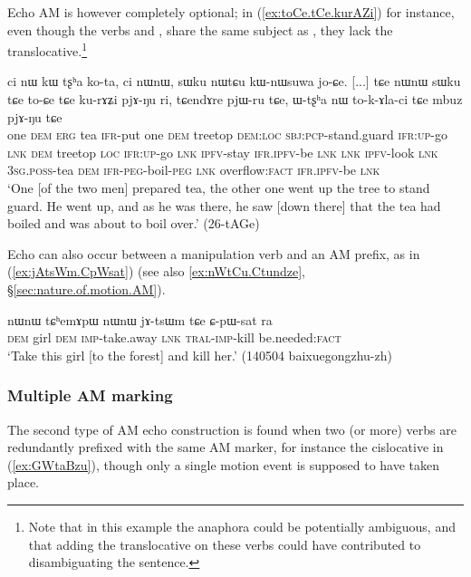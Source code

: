 Echo AM is however completely optional; in (\ref{ex:toCe.tCe.kurAZi}) for instance, even though the verbs  and , share the same subject as , they lack the translocative.\footnote{Note that in this example the anaphora could be potentially ambiguous, and that adding the translocative on these verbs could have contributed to disambiguating the sentence. }

\begin{exe}
\ex \label{ex:toCe.tCe.kurAZi}
\gll ci nɯ kɯ tʂʰa ko-ta, ci nɯnɯ, sɯku nɯtɕu kɯ-nɯsuwa jo-ɕe. [...] tɕe nɯnɯ sɯku tɕe to-ɕe tɕe ku-rɤʑi pjɤ-ŋu ri,
tɕendɤre pjɯ-ru tɕe, ɯ-tʂʰa nɯ to-k-ɤla-ci tɕe mbuz pjɤ-ŋu tɕe  \\
one \textsc{dem} \textsc{erg} tea \textsc{ifr}-put one \textsc{dem} treetop \textsc{dem}:\textsc{loc} \textsc{sbj}:\textsc{pcp}-stand.guard \textsc{ifr}:\textsc{up}-go { } \textsc{lnk} \textsc{dem} treetop \textsc{loc} \textsc{ifr}:\textsc{up}-go \textsc{lnk} \textsc{ipfv}-stay \textsc{ifr}.\textsc{ipfv}-be \textsc{lnk} \textsc{lnk} \textsc{ipfv}-look \textsc{lnk} \textsc{3sg}.\textsc{poss}-tea \textsc{dem} \textsc{ifr}-\textsc{peg}-boil-\textsc{peg} \textsc{lnk} overflow:\textsc{fact} \textsc{ifr}.\textsc{ipfv}-be \textsc{lnk} \\
\glt `One [of the two men] prepared tea, the other one went up the tree to stand guard. He went up, and as he was there, he saw [down there] that the tea had boiled and was about to boil over.' (26-tAGe) 	
\end{exe}

Echo can also occur between a manipulation verb and an AM prefix, as in (\ref{ex:jAtsWm.CpWsat}) (see also  \ref{ex:nWtCu.Ctundze},  §\ref{sec:nature.of.motion.AM}).

\begin{exe}
	\ex \label{ex:jAtsWm.CpWsat}
	\gll nɯnɯ tɕʰemɤpɯ nɯnɯ jɤ-tsɯm tɕe ɕ-pɯ-sat ra \\
	\textsc{dem} girl \textsc{dem} \textsc{imp}-take.away \textsc{lnk} \textsc{tral}-\textsc{imp}-kill be.needed:\textsc{fact} \\
	\glt `Take this girl [to the forest] and kill her.' (140504 baixuegongzhu-zh) 	
\end{exe}


\subsubsection{Multiple AM marking} \label{sec:echo.multiple.AM}
The second type of AM echo construction is found when two (or more) verbs are redundantly prefixed with the same AM marker, for instance the cislocative  in (\ref{ex:GWtaBzu}), though only a single motion event is supposed to have taken place.

